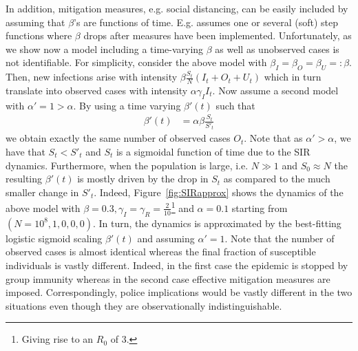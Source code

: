 \documentclass[fullpage,a4paper]{article}
\newcommand{\fig}[1]{Figure~\ref{fig:#1}}
\begin{document}
In addition, mitigation measures, e.g. social distancing, can be
easily included by assuming that $\beta$'s are functions of
time. E.g. \cite{arxiv:2004.01105} assumes one or several (soft) step
functions where $\beta$ drops after measures have been
implemented. Unfortunately, as we show now a model including a
time-varying $\beta$ as well as unobserved cases is not identifiable.
For simplicity, consider the above model with $\beta_I = \beta_O =
\beta_U =: \beta$. Then, new infections arise with intensity $\beta
\frac{S_t}{N} (I_t + O_t + U_t)$ which in turn translate into observed
cases with intensity $\alpha \gamma_I I_t$. Now assume a second model
with $\alpha' = 1 > \alpha$. By using a time varying $\beta'(t)$
such that
\begin{align*}
  \beta'(t) &= \alpha \beta \frac{S_t}{S'_t}
\end{align*}
we obtain exactly the same number of observed cases $O_t$. Note that
as $\alpha' > \alpha$, we have that $S_t < S'_t$ and $S_t$ is a
sigmoidal function of time due to the SIR dynamics. Furthermore, when
the population is large, i.e. $N \gg 1$ and $S_0 \approx N$ the
resulting $\beta'(t)$ is mostly driven by the drop in $S_t$ as
compared to the much smaller change in $S'_t$. Indeed, \fig{SIRapprox}
shows the dynamics of the above model with $\beta = 0.3, \gamma_I =
\gamma_R = \frac{2}{10}$\footnote{Giving rise to an $R_0$ of $3$.} and
$\alpha = 0.1$ starting from $(N = 10^8, 1, 0, 0, 0)$. In turn, the
dynamics is approximated by the best-fitting logistic sigmoid scaling
$\beta'(t)$ and assuming $\alpha' = 1$. Note that the number of
observed cases is almost identical whereas the final fraction of
susceptible individuals is vastly different. Indeed, in the first case
the epidemic is stopped by group immunity whereas in the second case
effective mitigation measures are imposed. Correspondingly, police
implications would be vastly different in the two situations even
though they are observationally indistinguishable.
\end{document}
